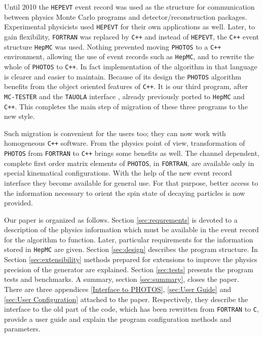 \documentclass[]{Photos_interface_design}
\begin{document}
Until 2010 the {\tt HEPEVT} \cite{Altarelli:1989wu} event record was used as the structure for 
communication between physics Monte Carlo programs and detector/reconstruction 
packages. Experimental physicists used {\tt HEPEVT} 
for their own applications  as well. Later, to gain  flexibility, {\tt FORTRAN} was replaced by {\tt C++} and 
instead of {\tt HEPEVT}, the {\tt C++} event structure  {\tt HepMC} \cite{Dobbs:2001ck}
was used. Nothing prevented 
moving {\tt PHOTOS} to a {\tt C++} environment, allowing the use of event records such as {\tt HepMC},
and to rewrite the whole 
of {\tt PHOTOS} to {\tt C++}. In fact implementation of the algorithm in that language 
is clearer and easier to
 maintain. Because of its design the {\tt PHOTOS} algorithm benefits from the object 
oriented features of {\tt C++}. It is our third program, after {\tt MC-TESTER} \cite{Davidson:2008ma}
and the {\tt TAUOLA} interface \cite{Davidson:2010rw}, already previously ported to {\tt HepMC} and {\tt C++}.
This completes the main step of migration of these three programs to the new style.

Such migration is convenient for the users too; they can now work
with  homogeneous {\tt C++} software. From the physics point of view, transformation 
of {\tt PHOTOS} 
from {\tt FORTRAN} to {\tt C++}  brings some benefits as well.
The channel dependent, complete first order matrix elements of {\tt PHOTOS}, in {\tt FORTRAN},
 are available only 
in special
kinematical configurations. With the help of the new  event record interface they  become
available for general use.
For that purpose, better access to the information necessary to orient the spin state of decaying particles
is now provided.



Our paper is organized as follows. Section \ref{sec:requrements} is devoted
to a description of the physics information which must be available in the event
record for the algorithm to function. Later, particular requirements for the 
information stored in {\tt HepMC} are given. Section \ref{sec:design} describes
the program structure. In Section \ref{sec:extensibility} methods prepared for 
extensions to improve the physics precision of the generator are explained.
Section \ref{sec:tests} presents the program tests and benchmarks. 
A summary, section \ref{sec:summary}, closes the paper.
There are three appendices \ref{Interface to PHOTOS}, 
\ref{sec:User Guide} and \ref{sec:User Configuration} attached to the paper.
Respectively, they describe the interface to the old part of the code, which has been rewritten from {\tt FORTRAN} to {\tt C},
provide a user guide and explain the program configuration methods and parameters. 
\end{document}
